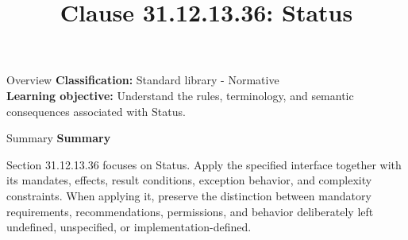 \documentclass[10pt,letterpaper]{article}
\title{Clause 31.12.13.36: Status}
\author{}
\date{}
\begin{document}
\maketitle
\begin{CornellOverviewBox}{Overview}
\textbf{Classification:} Standard library - Normative\\[2pt]
\textbf{Learning objective:} Understand the rules, terminology, and semantic consequences associated with Status.
\end{CornellOverviewBox}\begin{CornellSummaryBox}{Summary}
{\sffamily\bfseries\color{Accent} Summary}\par\vspace{3pt}Section 31.12.13.36 focuses on Status. Apply the specified interface together with its mandates, effects, result conditions, exception behavior, and complexity constraints. When applying it, preserve the distinction between mandatory requirements, recommendations, permissions, and behavior deliberately left undefined, unspecified, or implementation-defined.
\end{CornellSummaryBox}
\end{document}
